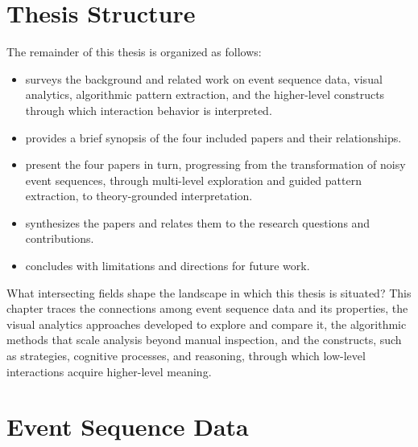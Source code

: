 \section{Thesis Structure}

The remainder of this thesis is organized as follows:
\begin{itemize}
    \item 
     surveys the background and related work on event sequence data, visual analytics, algorithmic pattern extraction, and the higher-level constructs through which interaction behavior is interpreted.
    
    \item 
     provides a brief synopsis of the four included papers and their relationships.
    
    \item 
     present the four papers in turn, progressing from the transformation of noisy event sequences, through multi-level exploration and guided pattern extraction, to theory-grounded interpretation.
    
    \item
     synthesizes the papers and relates them to the research questions and contributions.
    
    \item
     concludes with limitations and directions for future work.
\end{itemize}

\label{cha:background}

What intersecting fields shape the landscape in which this thesis is situated?
This chapter traces the connections among event sequence data and its properties, the visual analytics approaches developed to explore and compare it, the algorithmic methods that scale analysis beyond manual inspection, and the constructs, such as strategies, cognitive processes, and reasoning, through which low-level interactions acquire higher-level meaning.





\section{Event Sequence Data}

